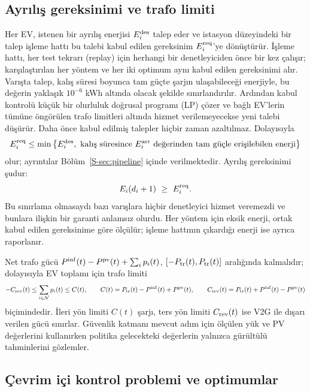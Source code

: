 \subsection{Ayrılış gereksinimi ve trafo limiti}\label{sec:requirement}

Her EV, istenen bir ayrılış enerjisi $E_i^{\mathrm{des}}$ talep eder ve istasyon düzeyindeki bir talep işleme hattı bu talebi kabul edilen gereksinim $E^{\mathrm{req}}_i$'ye dönüştürür.
İşleme hattı, her test tekrarı (replay) için herhangi bir denetleyiciden önce bir kez çalışır; karşılaştırılan her yöntem ve her iki optimum aynı kabul edilen gereksinimi alır.
Varışta talep, kalış süresi boyunca tam güçte şarjın ulaşabileceği enerjiyle, bu değerin yaklaşık $10^{-6}$ kWh altında olacak şekilde sınırlandırılır.
Ardından kabul kontrolü küçük bir olurluluk doğrusal programı (LP) çözer ve bağlı EV'lerin tümüne öngörülen trafo limitleri altında hizmet verilemeyecekse yeni talebi düşürür.
Daha önce kabul edilmiş talepler hiçbir zaman azaltılmaz.
Dolayısıyla
\begin{equation}\label{eq:cap}
E^{\mathrm{req}}_i\le\min\big\{E_i^{\mathrm{des}},\ \text{kalış süresince }E_i^{\mathrm{arr}}\text{ değerinden tam güçle erişilebilen enerji}\big\}
\end{equation}
olur; ayrıntılar Bölüm~\ref{S-sec:pipeline} içinde verilmektedir.
Ayrılış gereksinimi şudur:
\begin{equation}\label{eq:requirement}
E_i(d_i+1)\ \ge\ E^{\mathrm{req}}_i .
\end{equation}
Bu sınırlama olmasaydı bazı varışlara hiçbir denetleyici hizmet veremezdi ve bunlara ilişkin bir garanti anlamsız olurdu.
Her yöntem için eksik enerji, ortak kabul edilen gereksinime göre ölçülür; işleme hattının çıkardığı enerji ise ayrıca raporlanır.

Net trafo gücü $P^{\mathrm{inf}}(t)-P^{\mathrm{pv}}(t)+\sum_{i}p_i(t)$, $[-P_{\mathrm{tr}}(t),P_{\mathrm{tr}}(t)]$ aralığında kalmalıdır; dolayısıyla EV toplamı için trafo limiti
\begin{equation}\label{eq:transformer}
-C_{\mathrm{rev}}(t)\le\sum_{i\in\mathcal N}p_i(t)\le C(t),\qquad
C(t)=P_{\mathrm{tr}}(t)-P^{\mathrm{inf}}(t)+P^{\mathrm{pv}}(t),\qquad C_{\mathrm{rev}}(t)=P_{\mathrm{tr}}(t)+P^{\mathrm{inf}}(t)-P^{\mathrm{pv}}(t)
\end{equation}
biçimindedir.
İleri yön limiti $C(t)$ şarjı, ters yön limiti $C_{\mathrm{rev}}(t)$ ise V2G ile dışarı verilen gücü sınırlar.
Güvenlik katmanı mevcut adım için ölçülen yük ve PV değerlerini kullanırken politika gelecekteki değerlerin yalnızca gürültülü tahminlerini gözlemler.

\subsection{Çevrim içi kontrol problemi ve optimumlar}\label{sec:online}

